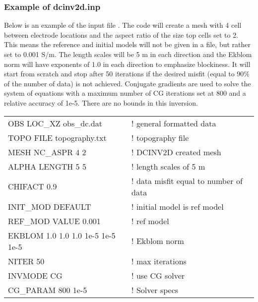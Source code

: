  
\subsubsection*{Example of dcinv2d.inp}
Below is an example of the input file . The code will create a mesh with 4 cell between electrode locations and the aspect ratio of the size top cells set to 2. This means the reference and initial models will not be given in a file, but rather set to 0.001 S/m. The length scales will be 5 m in each direction and the Ekblom norm will have exponents of 1.0 in each direction to emphasize blockiness. It will start from scratch and stop after 50 iterations if the desired misfit (equal to 90\% of the number of data) is not achieved. Conjugate gradients are used to solve the system of equations with a maximum number of CG iterations set at 800 and a relative accuracy of 1e-5. There are no bounds in this inversion.

\begin{fileExample}
\begin{tabular}{|ll|}
\hline
OBS LOC\_XZ obs\_dc.dat & ! general formatted data \\
TOPO FILE topography.txt & ! topography file\\
MESH NC\_ASPR 4 2 & ! DCINV2D created mesh \\
ALPHA LENGTH 5 5 & ! length scales of 5 m \\
CHIFACT 0.9 & ! data misfit equal to number of data \\
INIT\_MOD DEFAULT & ! initial model is ref model \\
REF\_MOD VALUE 0.001 & ! ref model \\ 
EKBLOM 1.0 1.0 1.0 1e-5 1e-5 1e-5 & ! Ekblom norm \\
NITER 50 & ! max iterations \\
INVMODE CG & ! use CG solver \\
CG\_PARAM 800 1e-5 & ! Solver specs \\
\hline
\end{tabular}
\end{fileExample}


